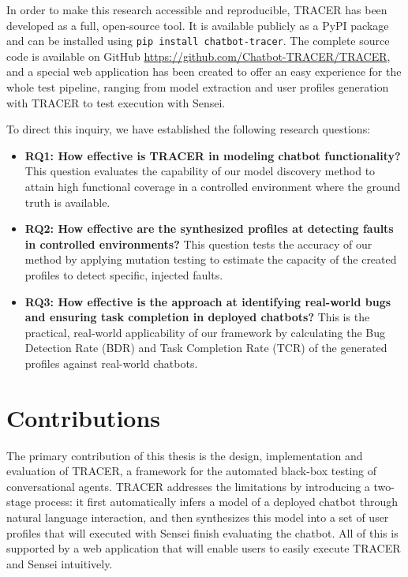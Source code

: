 In order to make this research accessible and reproducible, \ac{TRACER} has been developed as a full, open-source tool.
It is available publicly as a \ac{PyPI} package \autocite{sotillodelhornoChatbottracerToolModel} and can be installed using \texttt{pip install chatbot-tracer}.
The complete source code is available on GitHub \url{https://github.com/Chatbot-TRACER/TRACER}, and a special web application has been created to offer an easy experience for the whole test pipeline, ranging from model extraction and user profiles generation with \ac{TRACER} to test execution with Sensei.


To direct this inquiry, we have established the following research questions:
\begin{itemize}
\item \textbf{RQ1: How effective is TRACER in modeling chatbot functionality?}
  This question evaluates the capability of our model discovery method to attain high functional coverage in a controlled environment where the ground truth is available.
\item \textbf{RQ2: How effective are the synthesized profiles at detecting faults in controlled environments?}
  This question tests the accuracy of our method by applying mutation testing \autocite{gomez-abajoMutationTestingTaskOriented2024} to estimate the capacity of the created profiles to detect specific, injected faults.
\item \textbf{RQ3: How effective is the approach at identifying real-world bugs and ensuring task completion in deployed chatbots?}
  This is the practical, real-world applicability of our framework by calculating the Bug Detection Rate (\ac{BDR}) and Task Completion Rate (\ac{TCR}) of the generated profiles against real-world chatbots.
\end{itemize}

\section{Contributions}

The primary contribution of this thesis is the design, implementation and evaluation of \acf{TRACER},
a framework for the automated black-box testing of conversational agents.
\ac{TRACER} addresses the limitations by introducing a two-stage process:
it first automatically infers a model of a deployed chatbot through natural language interaction,
and then synthesizes this model into a set of user profiles
that will executed with Sensei \autocite{delaraSensei} finish evaluating the chatbot.
All of this is supported by a web application that will enable users to easily execute TRACER and Sensei intuitively.

